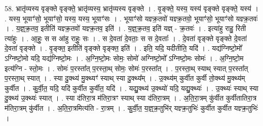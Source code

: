 \documentclass[17pt]{extarticle}
\begin{document}
58. भ्रातृ॑व्यस्य वृङ्क्ते वृङ्क्ते॒ भ्रातृ॑व्यस्य॒ भ्रातृ॑व्यस्य वृङ्क्ते । . वृ॒ङ्क्ते॒ यस्य॒ यस्य॑ वृङ्क्ते वृङ्क्ते॒ यस्य॑ । . यस्य॒ भूयाꣳ॑सो॒ भूयाꣳ॑सो॒ यस्य॒ यस्य॒ भूयाꣳ॑सः । . भूयाꣳ॑सो यज्ञ्क्र॒तवो॑ यज्ञ्क्र॒तवो॒ भूयाꣳ॑सो॒ भूयाꣳ॑सो यज्ञ्क्र॒तवः॑ । . य॒ज्ञ्॒क्र॒तव॒ इतीति॑ यज्ञ्क्र॒तवो॑ यज्ञ्क्र॒तव॒ इति॑ । . य॒ज्ञ्॒क्र॒तव॒ इति॑ यज्ञ् - क्र॒तवः॑ । . इत्या॑हु राहु॒ रिती त्या॑हुः । . आ॒हुः॒ स स आ॑हु राहुः॒ सः । . स दे॒वता॑ दे॒वताः॒ स स दे॒वताः᳚ । . दे॒वता॑ वृङ्क्ते वृङ्क्ते दे॒वता॑ दे॒वता॑ वृङ्क्ते । . वृ॒ङ्क्त॒ इतीति॑ वृङ्क्ते वृङ्क्त॒ इति॑ । . इति॒ यदि॒ यदीतीति॒ यदि॑ । . यद्य॑ग्निष्टो॒मो᳚ ऽग्निष्टो॒मो यदि॒ यद्य॑ग्निष्टो॒मः । . अ॒ग्नि॒ष्टो॒मः सोमः॒ सोमो॑ अग्निष्टो॒मो᳚ ऽग्निष्टो॒मः सोमः॑ । . अ॒ग्नि॒ष्टो॒म इत्य॑ग्नि - स्तो॒मः । . सोमः॑ प॒रस्ता᳚त् प॒रस्ता॒थ् सोमः॒ सोमः॑ प॒रस्ता᳚त् । . प॒रस्ता॒थ् स्याथ् स्यात् प॒रस्ता᳚त् प॒रस्ता॒थ् स्यात् । . स्या दु॒क्थ्य॑ मु॒क्थ्यꣳ॑ स्याथ् स्या दु॒क्थ्य᳚म् । . उ॒क्थ्य॑म् कुर्वीत कुर्वी तो॒क्थ्य॑ मु॒क्थ्य॑म् कुर्वीत । . कु॒र्वी॒त॒ यदि॒ यदि॑ कुर्वीत कुर्वीत॒ यदि॑ । . यद्यु॒क्थ्य॑ उ॒क्थ्यो॑ यदि॒ यद्यु॒क्थ्यः॑ । . उ॒क्थ्यः॑ स्याथ् स्या दु॒क्थ्य॑ उ॒क्थ्यः॑ स्यात् । . स्या द॑तिरा॒त्र म॑तिरा॒त्रꣳ स्याथ् स्या द॑तिरा॒त्रम् । . अ॒ति॒रा॒त्रम् कु॑र्वीत कुर्वीतातिरा॒त्र म॑तिरा॒त्रम् कु॑र्वीत । . अ॒ति॒रा॒त्रमित्य॑ति - रा॒त्रम् । . कु॒र्वी॒त॒ य॒ज्ञ्॒क्र॒तुभि॑र् यज्ञ्क्र॒तुभिः॑ कुर्वीत कुर्वीत यज्ञ्क्र॒तुभिः॑ । \newline
\end{document}
